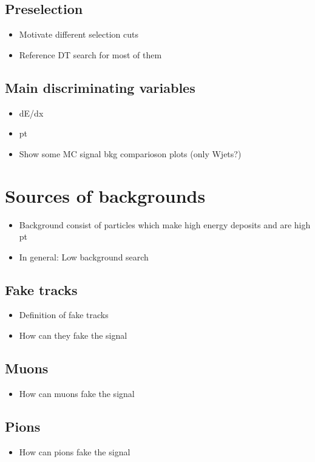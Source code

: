 \subsection{Preselection}
\begin{itemize}
\item Motivate different selection cuts
\item Reference DT search for most of them
\end{itemize}
\subsection{Main discriminating variables}
\begin{itemize}
\item dE/dx
\item pt
\item Show some MC signal bkg comparioson plots (only Wjets?)
\end{itemize}

\section{Sources of backgrounds}
\label{sec:SourcesOfBackgrounds}
\begin{itemize}
\item Background consist of particles which make high energy deposits and are high pt
\item In general: Low background search
\end{itemize}
\subsection{Fake tracks}
\begin{itemize}
\item Definition of fake tracks
\item How can they fake the signal
\end{itemize}
\subsection{Muons}
\begin{itemize}
\item How can muons fake the signal
\end{itemize}
\subsection{Pions}
\begin{itemize}
\item How can pions fake the signal
\end{itemize}
